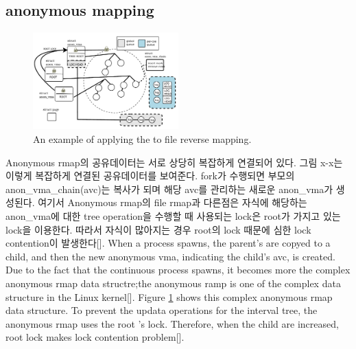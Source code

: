 \subsection{anonymous mapping}


\begin{figure}[tb]
  \begin{center}
     \includegraphics[width=0.5\textwidth,height=0.5\textheight,keepaspectratio]{fig/anon_vma}
  \end{center}
  \caption{An example of applying the  to file reverse mapping. }
  \label{fig:anonvmaramp}
\end{figure}

\ifkor
Anonymous rmap의 공유데이터는 서로 상당히 복잡하게 연결되어 있다. 
그림 x-x는 이렇게 복잡하게 연결된 공유데이터를 보여준다.
fork가 수행되면 부모의 anon\_vma\_chain(avc)는 복사가 되며 해당 avc를 관리하는 새로운 anon\_vma가 생성된다. 
여기서 Anonymous rmap의 file rmap과 다른점은 자식에 해당하는 anon\_vma에 대한 tree operation을
수행할 때 사용되는 lock은 root가 가지고 있는 lock을 이용한다. 
따라서 자식이 많아지는 경우 root의 lock 때문에 심한 lock contention이 발생한다[].
\else
When a process spawns, the parent's  are copyed
to a child, and then the new anonymous vma, indicating the child's avc, is
created.
Due to the fact that the continuous process spawns, it becomes more the complex
anonymous rmap data structre;the anonymous ramp is one of the complex data
structure in the Linux kernel[].
Figure \ref{fig:anonvmaramp} shows this complex anonymous rmap data
structure.
To prevent the updata operations for the interval tree, the anonymous rmap
uses the root 's lock. 
Therefore, when the child  are increased, root lock makes lock
contention problem[].
\fi


